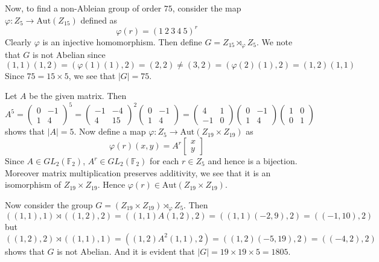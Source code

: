 \documentclass[12pt]{exam}
\theoremstyle{plain} %
\theoremstyle{definition} %
\theoremstyle{remark} %
\begin{document}
\begin{questions}
\begin{solution}
    Now, to find a non-Ableian group of order $75$, consider the map
    $\varphi: Z_5 \to \textrm{Aut}(Z_{15})$ defined as \[
      \varphi(r) = (1\ 2\ 3\ 4\ 5)^r
    \]
    Clearly $\varphi$ is an injective homomorphism. Then define $G =
    Z_{15} \rtimes_\varphi Z_5$. We note that $G$ is not Abelian since \[
      (1, 1)(1, 2) = (\varphi(1)(1), 2) = (2, 2) \neq (3, 2)=
      (\varphi(2)(1), 2) = (1, 2)(1, 1)
    \]
    Since $75 = 15 \times 5$, we see that $|G| = 75$.
  \end{solution}

  \question
  \begin{solution}
    Let $A$ be the given matrix. Then
    \[ A^5 =
      \begin{pmatrix}%
        0 & -1 \\
        1 & 4
      \end{pmatrix}^5
      =
      \begin{pmatrix}%
        -1 & -4 \\
        4 & 15
      \end{pmatrix}^2
      \begin{pmatrix}%
        0 & -1 \\
        1  & 4
      \end{pmatrix} =
      \begin{pmatrix}%
        4 & 1 \\
        -1 & 0
      \end{pmatrix}
      \begin{pmatrix}%
        0 & -1 \\
        1 & 4
      \end{pmatrix}
      \begin{pmatrix}%
        1 & 0 \\
        0 & 1
      \end{pmatrix}
    \]
    shows that $|A| = 5$. Now define a map $\varphi: Z_{5} \to
    \textrm{Aut}(Z_{19} \times Z_{19})$ as \[
      \varphi(r)(x, y) = A^r
      \begin{bmatrix}%
        x \\
        y
      \end{bmatrix}
    \]
    Since $A \in GL_2(\mathbb{F}_2)$, $A^r \in GL_2(\mathbb{F}_2)$
    for each $r \in Z_5$ and hence is a bijection. Moreover matrix
    multiplication preserves additivity, we see that it is an
    isomorphism of $Z_{19}\times Z_{19}$. Hence $\varphi(r) \in
    \textrm{Aut}(Z_{19} \times Z_{19})$.

    Now consider the group $G = (Z_{19} \times Z_{19})
    \rtimes_\varphi Z_5$. Then \[
      ((1, 1), 1) \rtimes ((1, 2), 2) = ((1, 1) A(1, 2), 2) = ((1,
      1)(-2, 9), 2) = ((-1,10), 2 )
    \]
    but \[
      ((1, 2), 2) \rtimes ((1, 1), 1) = ((1, 2) A^2(1, 1), 2) = ((1,
      2)(-5, 19), 2) = ((-4, 2), 2)
    \]
    shows that $G$ is not Abelian. And it is evident that $|G| = 19
    \times 19 \times 5 = 1805$.


\end{solution}
\end{questions}
\end{document}
